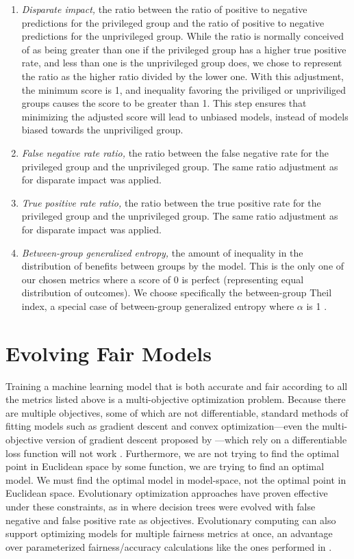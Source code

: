 \documentclass[twoside]{article}
\begin{document}
\begin{enumerate}
	\item \textit{Disparate impact,} the ratio between the ratio of positive to negative predictions for the privileged group and the ratio of positive to negative predictions for the unprivileged group. While the ratio is normally conceived of as being greater than one if the privileged group has a higher true positive rate, and less than one is the unprivileged group does, we chose to represent the ratio as the higher ratio divided by the lower one. With this adjustment, the minimum score is 1, and inequality favoring the priviliged or unpriviliged groups causes the score to be greater than 1. This step ensures that minimizing the adjusted score will lead to unbiased models, instead of models biased towards the unpriviliged group.
	\item \textit{False negative rate ratio,} the ratio between the false negative rate for the privileged group and the unprivileged group. The same ratio adjustment as for disparate impact was applied.
	\item \textit{True positive rate ratio,} the ratio between the true positive rate for the privileged group and the unprivileged group. The same ratio adjustment as for disparate impact was applied.
	\item \textit{Between-group generalized entropy,} the amount of inequality in the distribution of benefits between groups by the model. This is the only one of our chosen metrics where a score of 0 is perfect (representing equal distribution of outcomes). We choose specifically the between-group Theil index, a special case of between-group generalized entropy where $\alpha$ is 1 \citep{Speicher:2018}.
\end{enumerate}


\section{Evolving Fair Models}
Training a machine learning model that is both accurate and fair according to all the metrics listed above is a multi-objective optimization problem. Because there are multiple objectives, some of which are not differentiable, standard methods of fitting models such as gradient descent and convex optimization---even the multi-objective version of gradient descent proposed by \citep{Desideri:2012}---which rely on a differentiable loss function will not work \citep{Zerbinati:2011}. Furthermore, we are not trying to find the optimal point in Euclidean space by some function, we are trying to find an optimal model. We must find the optimal model in model-space, not the optimal point in Euclidean space. Evolutionary optimization approaches have proven effective under these constraints, as in \citep{Zhao:2007} where decision trees were evolved with false negative and false positive rate as objectives. Evolutionary computing can also support optimizing models for multiple fairness metrics at once, an advantage over parameterized fairness/accuracy calculations like the ones performed in \citep{Friedler:2019}. 
\end{document}
